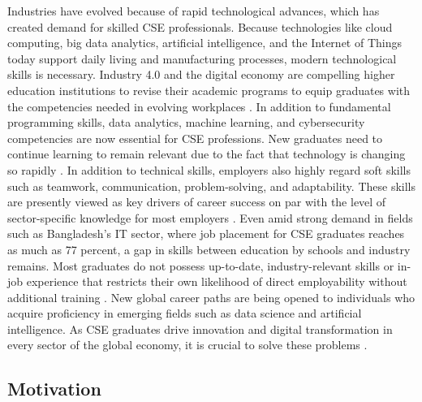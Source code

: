 \documentclass[final,5p,times,twocolumn]{elsarticle}
\begin{document}
Industries have evolved because of rapid technological advances, which has created demand for skilled CSE professionals. Because technologies like cloud computing, big data analytics, artificial intelligence, and the Internet of Things today support daily living and manufacturing processes, modern technological skills is necessary.  Industry 4.0 and the digital economy are compelling higher education institutions to revise their academic programs to equip graduates with the competencies needed in evolving workplaces \cite{1_MisraKhurana2017} . In addition to fundamental programming skills, data analytics, machine learning, and cybersecurity competencies are now essential for CSE professions. New graduates need to continue learning to remain relevant due to the fact that technology is changing so rapidly \cite{3_DeSilva2024} . In addition to technical skills, employers also highly regard soft skills such as teamwork, communication, problem-solving, and adaptability.
These skills are presently viewed as key drivers of career success on par with the level of sector-specific knowledge for most employers \cite{5_MohammedOzdamli2024} . Even amid strong demand in fields such as Bangladesh's IT sector, where job placement for CSE graduates reaches as much as 77 percent, a gap in skills between education by schools and industry remains. Most graduates do not possess up-to-date, industry-relevant skills or in-job experience that restricts their own likelihood of direct employability without additional training \cite{4_Chakraborty2019} . New global career paths are being opened to individuals who acquire proficiency in emerging fields such as data science and artificial intelligence. As CSE graduates drive innovation and digital transformation in every sector of the global economy, it is crucial to solve these problems \cite{6_PrinceIdrisKawserAlif2025} .

\subsection{Motivation}
\end{document}
